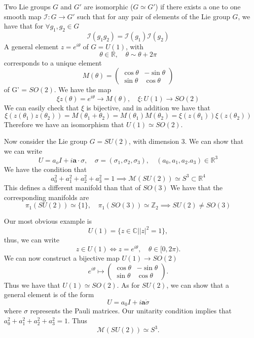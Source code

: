 Two Lie groups $G$ and $G' $ are isomorphic  ($G \simeq G'$) if there exists a one to one smooth map $\mathcal{ I } : G \rightarrow G' $ such that for any pair of elements of the Lie group $G$, we have that for $\forall g_1, g_2 \in G$
\[ 
	\mathcal{ I } ( g_1 g_2 ) = \mathcal{ I } ( g_1 ) \mathcal { I } ( g_2 ) 
\]
A general element $z  = e^ { i \theta } $ of $G  = U ( 1) $, with 
\[ 
	\theta \in \mathbb{ R}, \quad \theta \sim \theta + 2 \pi \] 
corresponds to a unique element 
\[ 
	M (\theta )  = \begin{pmatrix} \cos \theta &  - \sin \theta \\ \sin \theta & \cos \theta \end{pmatrix} 
\] of G'  = $SO ( 2) $. We have the map 
\[ 
	 \xi z( \theta)  = e^ { i \theta } \rightarrow M ( \theta ), \quad \xi : U ( 1) \rightarrow SO ( 2) 
	 \] 
	We can easily check that $ \xi $ is bijective, and in addition we have that 
	\[ 
	 	\xi ( z( \theta_1 ) z( \theta_ 2) )  = M ( \theta_1 + \theta_2 )  = M ( \theta_1 ) M ( \theta_2 )  = \xi ( z ( \theta_1 ) ) \xi ( z ( \theta_2 ) ) 
	\] Therefore we have an isomorphism that $U ( 1) \simeq SO ( 2) $. 

Now consider the Lie group $G = SU ( 2) $, with dimension $3$. We can show that we can write 
\[ 
	U = a_o I + i \mathbf{ a} \cdot \sigma, \quad \sigma  = ( \sigma_1, \sigma_2, \sigma_3 ), \quad (a_0 , a_1, a_2. a_3 ) \in \mathbb{R}^3 
\] We have the condition that 
\[ 
 	a_0^2 + a_1^2 + a_2^2 + a_3^2  = 1 \implies \mathcal { M }( SU ( 2) ) \simeq S^3 \subset \mathbb{ R}^4 
\] This defines a different manifold than that of $ SO ( 3) $
We have that the corresponding manifolds are 
\[ 
	 \pi_1 ( SU ( 2) ) \simeq \{ 1 \}, \quad \pi_1 ( SO ( 3) ) \simeq \mathbb{ Z}_2 \implies SU ( 2) \neq SO ( 3) 
\] 

Our most obvious example is 
\[
	U(1) = \{z \in \mathbb{C} | |z|^2 = 1 \}, 
\]
thus, we can write 
\[
	z \in U(1) \iff z = e^{i \theta}, \quad \theta \in [0, 2 \pi ). 
\]
We can now construct a bijective map $U(1) \rightarrow SO(2)$
\[ 
	e^{i \theta} \mapsto  \begin{pmatrix}
	\cos \theta &   - \sin \theta \\
	\sin \theta & \cos \theta
	\end{pmatrix}. 
\] 
Thus we have that $U(1) \simeq SO(2)$. As for $SU(2)$, we can show that a general element is of the form 
\[ 
	U = a_0I + i \mathbf{a} \dot \sigma
\]
where $\sigma$ represents the Pauli matrices. Our unitarity condition implies that $a_0^2 + a_1^2 + a_2^2 + a_3^2 = 1$. 
Thus 
\[ 
	\mathcal{M}(SU(2)) \simeq S^3. 
\] 



\pagebreak 
